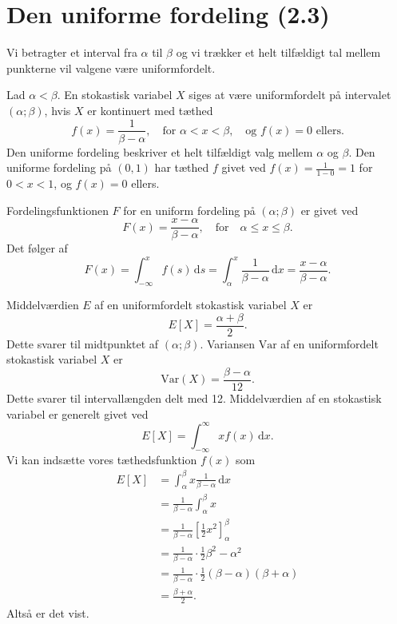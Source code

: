 
\section{Den uniforme fordeling (2.3)}
Vi betragter et interval fra $\alpha$ til $\beta$ og vi trækker et helt tilfældigt tal mellem punkterne vil valgene være uniformfordelt.
\begin{definition} 
  Lad $\alpha < \beta$. En stokastisk variabel $X$ siges at være uniformfordelt på intervalet $(\alpha; \beta)$, hvis $X$ er kontinuert med tæthed
  \[ 
  f(x) = \frac{1}{\beta - \alpha}, \quad \text{for } \alpha < x < \beta, \quad \text{og } f(x) = 0 \text{ ellers}
  .\]
  Den uniforme fordeling beskriver et helt tilfældigt valg mellem $\alpha$ og $\beta$. Den uniforme fordeling på $(0, 1)$ har tæthed $f$ givet ved $f(x) = \frac{1}{1-0} =1$ for $0 < x <1$, og $f(x) = 0$ ellers.
\end{definition}

\begin{sæt} 
  Fordelingsfunktionen $F$ for en uniform fordeling på $(\alpha; \beta)$ er givet ved
  \[ 
  F(x) = \frac{x-\alpha}{\beta - \alpha}, \quad \text{for} \quad \alpha \leq x \leq \beta
  .\]
  Det følger af
  \[ 
  F(x) = \int_{-\infty}^{x} f(s) \, \mathrm{d}s = \int_{\alpha}^{x} \frac{1}{\beta - \alpha} \, \mathrm{d}x = \frac{x - \alpha}{\beta - \alpha}
  .\]
\end{sæt}

\begin{sæt} 
  Middelværdien $E$ af en uniformfordelt stokastisk variabel $X$ er
  \[ 
    E[X] = \frac{\alpha + \beta}{2}
  .\]
  Dette svarer til midtpunktet af $(\alpha; \beta)$.
  \bigbreak
  Variansen $\mathrm{Var}$ af en uniformfordelt stokastisk variabel $X$ er
  \[ 
  \mathrm{Var}(X) = \frac{\beta - \alpha}{12}
  .\]
  Dette svarer til intervallængden delt med 12.
  \tcblower
  Middelværdien af en stokastisk variabel er generelt givet ved
  \[ 
    E[X] = \int_{-\infty}^{\infty} x f(x) \, \mathrm{d}x 
  .\]
  Vi kan indsætte vores tæthedsfunktion $f(x)$ som
  \begin{align*}
    E[X] &= \int_{\alpha}^{\beta} x \frac{1}{\beta - \alpha} \, \mathrm{d}x \\
    &= \frac{1}{\beta - \alpha} \int_{\alpha}^{\beta} x \\
    &= \frac{1}{\beta - \alpha} \left[ \frac{1}{2}x^2 \right]_{\alpha}^{\beta} \\
    &= \frac{1}{\beta - \alpha} \cdot \frac{1}{2} \beta^2 - \alpha^2 \\
    &= \frac{1}{\beta - \alpha} \cdot \frac{1}{2}(\beta - \alpha)(\beta + \alpha) \\
    &= \frac{\beta + \alpha}{2}
  .\end{align*}
  Altså er det vist.
\end{sæt}

